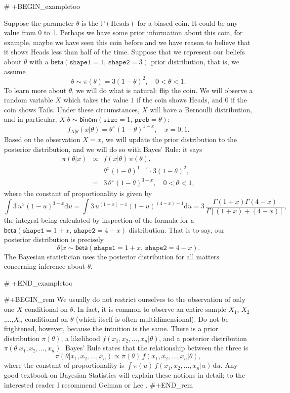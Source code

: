 # +BEGIN_exampletoo

Suppose the parameter \(\theta\) is the \(\mathbb{P}(\mbox{Heads})\)
for a biased coin. It could be any value from 0 to 1. Perhaps we have
some prior information about this coin, for example, maybe we have
seen this coin before and we have reason to believe that it shows
Heads less than half of the time. Suppose that we represent our
beliefs about \(\theta\) with a
\(\mathsf{beta}(\mathtt{shape1}=1,\,\mathtt{shape2}=3)\) prior
distribution, that is, we assume \[
\theta\sim\pi(\theta)=3(1-\theta)^{2},\quad 0 < \theta < 1.  \] To
learn more about \(\theta\), we will do what is natural: flip the
coin. We will observe a random variable \(X\) which takes the value
\(1\) if the coin shows Heads, and 0 if the coin shows Tails. Under
these circumstances, \(X\) will have a Bernoulli distribution, and in
particular,
\(X|\theta\sim\mathsf{binom}(\mathtt{size}=1,\,\mathtt{prob}=\theta)\):
\[ f_{X|\theta}(x|\theta)=\theta^{x}(1-\theta)^{1-x},\quad x=0,1.  \]
Based on the observation \(X=x\), we will update the prior
distribution to the posterior distribution, and we will do so with
Bayes' Rule: it says
\begin{eqnarray*}
\pi(\theta|x) & \propto & f(x|\theta) \, \pi(\theta),\\
 & = & \theta^{x}(1-\theta)^{1-x}\cdot3(1-\theta)^{2},\\
 & = & 3\,\theta^{x}(1-\theta)^{3-x},\quad 0 < \theta < 1,
\end{eqnarray*}
where the constant of proportionality is given by \[ \int3\,
u^{x}(1-u)^{3-x}\mathrm{d} u=\int3\,
u^{(1+x)-1}(1-u)^{(4-x)-1}\mathrm{d}
u=3\,\frac{\Gamma(1+x)\Gamma(4-x)}{\Gamma[(1+x)+(4-x)]}, \] the
integral being calculated by inspection of the formula for a
\(\mathsf{beta}(\mathtt{shape1}=1+x,\,\mathtt{shape2}=4-x)\)
distribution. That is to say, our posterior distribution is precisely
\[
\theta|x\sim\mathsf{beta}(\mathtt{shape1}=1+x,\,\mathtt{shape2}=4-x).
\] The Bayesian statistician uses the posterior distribution for all
matters concerning inference about \(\theta\).

# +END_exampletoo


#+BEGIN_rem
We usually do not restrict ourselves to the observation of only one
\(X\) conditional on \(\theta\). In fact, it is common to observe an
entire sample \(X_{1}\), \(X_{2}\),...,\(X_{n}\) conditional on
\(\theta\) (which itself is often multidimensional). Do not be
frightened, however, because the intuition is the same. There is a
prior distribution \(\pi(\theta)\), a likelihood
\(f(x_{1},x_{2},\ldots,x_{n}|\theta)\), and a posterior distribution
\(\pi(\theta|x_{1},x_{2},\ldots,x_{n})\). Bayes' Rule states that the
relationship between the three is \[
\pi(\theta|x_{1},x_{2},\ldots,x_{n})\propto\pi(\theta)\,
f(x_{1},x_{2},\ldots,x_{n}|\theta), \] where the constant of
proportionality is \(\int\pi(u)\,
f(x_{1},x_{2},\ldots,x_{n}|u)\,\mathrm{d} u\). Any good textbook on
Bayesian Statistics will explain these notions in detail; to the
interested reader I recommend Gelman \cite{Gelman2004} or Lee
\cite{Lee1997}.
#+END_rem

